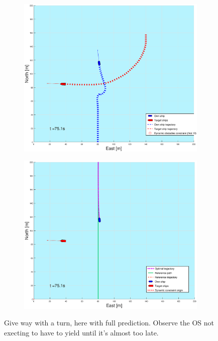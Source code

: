 \begin{figure}[ht!]
\begin{subfigure}[b]{0.499\textwidth}
    \end{subfigure}
    \hfill
    \\
    \begin{subfigure}[b]{0.49\textwidth}
        \centering
        \includegraphics[width=\textwidth]{Images/Figures/sving_GW/_Simple_0fig1_time=75}
    \end{subfigure}
    \hfill
    \begin{subfigure}[b]{0.499\textwidth}
        \centering
        \includegraphics[width=\textwidth]{Images/Figures/sving_GW/_Simple_0fig999_time=75}
    \end{subfigure}
    \hfill
    \caption{Give way with a turn, here with full prediction. Observe the \gls{OS} not execting to have to yield until it's almost too late.}
    \label{FIG: turn GW full pred}
\end{figure}%
